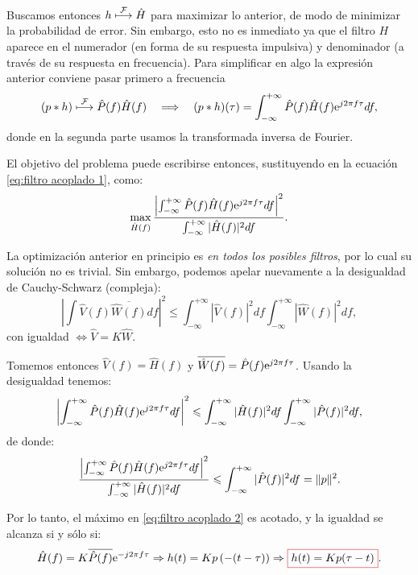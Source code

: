Buscamos entonces $h \;\displaystyle{\mathop{\longmapsto}^{\mathcal{F}}}\; \hat{H}$ para maximizar lo anterior, de modo de minimizar la probabilidad de error. Sin embargo, esto no es inmediato ya que el filtro $H$ aparece en el numerador (en forma de su respuesta impulsiva) y denominador (a través de su respuesta en frecuencia). Para simplificar en algo la expresión anterior conviene pasar primero a frecuencia
\begin{equation*}
    (p * h) \;\displaystyle{\mathop{\longmapsto}^{\mathcal{F}}}\; \hat{P}(f) \hat{H}(f) \quad \Longrightarrow \quad (p * h)(\tau) = \int_{-\infty}^{+\infty} \hat{P}(f)
\hat{H}(f) \mathrm{e}^{j2\pi f \tau}d f,
\end{equation*}
donde en la segunda parte usamos la transformada inversa de Fourier.

El objetivo del problema puede escribirse entonces, sustituyendo en la ecuación \eqref{eq:filtro acoplado 1}, como:
\begin{equation}\label{eq:filtro acoplado 2}
    \max_{\hat{H}(f)} \frac{\left|\int_{-\infty}^{+\infty}
\hat{P}(f) \hat{H}(f) \mathrm{e}^{j2\pi f \tau}df\right|^2}{\int_{-\infty}^{+\infty} |\hat{H}(f)|^2 df}.
\end{equation}

La optimización anterior en principio es \emph{en todos los posibles filtros}, por lo cual su solución no es trivial. Sin embargo, podemos apelar nuevamente a la desigualdad de Cauchy-Schwarz (compleja):
\begin{equation*}
\left|\int \hat{V}(f) \overline{\hat{W}(f)}df\right|^2\leqslant \int_{-\infty}^{+\infty} |\hat{V}(f)|^2 df \int_{-\infty}^{+\infty} |\hat{W}(f)|^2 df,
\end{equation*}
con igualdad $\Leftrightarrow \hat{V} = K \hat{W}$.

Tomemos entonces $\hat{V}(f) = \hat{H}(f)$ y $\overline{\hat{W}(f)} = \hat{P}(f)\mathrm{e}^{j2\pi f \tau}$. Usando la desigualdad tenemos:
\begin{equation*}
\left|\int_{-\infty}^{+\infty} \hat{P}(f) \hat{H}(f) \mathrm{e}^{j2\pi f \tau} df\right|^2\leqslant \int_{-\infty}^{+\infty} |\hat{H}(f)|^2 df \int_{-\infty}^{+\infty} |\hat{P}(f)|^2 df,
\end{equation*}
de donde:
\begin{equation*}
    \frac{\left|\int_{-\infty}^{+\infty} \hat{P}(f) \hat{H}(f) \mathrm{e}^{j2\pi f \tau}  df\right|^2}{\int_{-\infty}^{+\infty} |\hat{H}(f)|^2 df} \leqslant \int_{-\infty}^{+\infty} |\hat{P}(f)|^2 df = \|p\|^2.
\end{equation*}

Por lo tanto, el máximo en \eqref{eq:filtro acoplado 2} es acotado, y la igualdad se alcanza si y sólo si:
\begin{equation*}
\hat{H}(f) = K\overline{\hat{P}(f)}\e^{-j2\pi f \tau} \Rightarrow h(t)=K
p\left(-(t-\tau)\right)\Rightarrow \col{h(t) = K p(\tau-t)}.    
\end{equation*}

